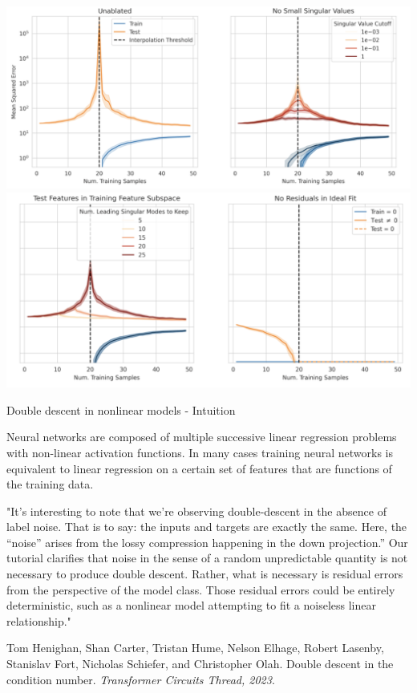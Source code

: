 \documentclass{beamer}
\begin{document}
\begin{frame}{}
    \begin{center}
        \includegraphics[scale=0.31]{ablate1.png}
        \includegraphics[scale=0.31]{ablate2.png}
    \end{center}
\end{frame}


\begin{frame}{Double descent in nonlinear models - Intuition}

    Neural networks are composed of multiple successive linear regression problems with non-linear activation functions. In many cases training neural networks is equivalent to linear regression on a certain set of features that are functions of the training data. 

    \hspace{5cm}

    \pause
    
    \tiny
    
    "It's interesting to note that we're observing double-descent in the absence of label noise. That is to say: the inputs and targets are exactly the same. Here, the “noise” arises from the lossy compression happening in the down projection.” Our tutorial clarifies that noise in the sense of a random unpredictable quantity is not necessary to produce double descent. Rather, what is necessary is residual errors from the perspective of the model class. Those residual errors could be entirely deterministic, such as a nonlinear model attempting to fit a noiseless linear relationship."
    
    \hspace{5cm}

    Tom Henighan, Shan Carter, Tristan Hume, Nelson Elhage, Robert Lasenby, Stanislav Fort,
    Nicholas Schiefer, and Christopher Olah. Double descent in the condition number. \emph{Transformer
    Circuits Thread, 2023}.
\end{frame}
\end{document}
